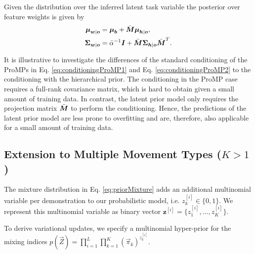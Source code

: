 Given the distribution over the inferred latent task variable  
the posterior over feature weights is given by 
\begin{align}
\boldsymbol{\mu}_{\boldsymbol{w} | \boldsymbol{o}} &= \boldsymbol{\mu}_{\boldsymbol{b}}  + \bar{\boldsymbol{M}}  \boldsymbol{\mu}_{\boldsymbol{h} | \boldsymbol{o}}, \label{eq:post_w_single} \\
\boldsymbol{\Sigma}_{\boldsymbol{w} |\boldsymbol{o}} &= \bar{\alpha} ^{-1} \boldsymbol{I} + \bar{\boldsymbol{M}}  \boldsymbol{\Sigma}_{\boldsymbol{h}| \boldsymbol{o}} \bar{\boldsymbol{M}} ^T. \label{eq:post_single_sigma}
\end{align}

It is illustrative to investigate the differences of the standard conditioning of the ProMPs in Eq. \eqref{eq:conditioningProMP1} and Eq. \eqref{eq:conditioningProMP2} 
to the conditioning with the hierarchical prior. 
The conditioning in the ProMP case requires a full-rank covariance matrix, 
which is hard to obtain given a small amount of training data. 
In contrast, the latent prior model only requires the 
projection matrix $\bar{\boldsymbol{M}} $ to perform the conditioning. 
Hence, the predictions of the latent prior model are less prone to overfitting and are, 
therefore, also applicable for a small amount of training data.

\subsection{Extension to Multiple Movement Types ($K>1$)}
\label{sec:mixmodel}

The mixture distribution in Eq. \eqref{eq:priorMixture} adds an additional multinomial variable per demonstration to our probabilistic model, 
i.e. $z^{[i]}_k \in \{0,1\}$. %
We represent this multinomial variable as binary vector $\mathbf{z}^{[i]} = \{z^{[i]}_1,...,z^{[i]}_K\}$. 

To derive variational updates, we specify a multinomial hyper-prior for the mixing indices 
$p(\vec Z) = \prod_{i=1}^L \prod_{k=1}^K (\vec \pi_k)^{z^{[i]}_k}$.

